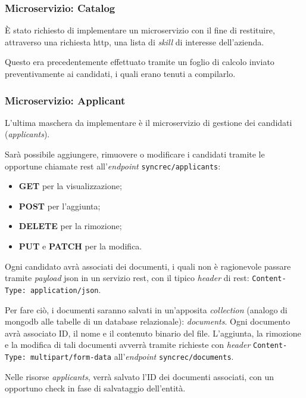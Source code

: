 \subsubsection{Microservizio: Catalog}

È stato richiesto di implementare un \gls{microservizio} con il fine di restituire,
attraverso una richiesta \acrshort{http}, una lista di \textit{skill} di interesse dell'azienda.

Questo era precedentemente effettuato tramite un foglio di calcolo inviato preventivamente ai candidati, i quali erano tenuti a compilarlo.

\subsubsection{Microservizio: Applicant}

L'ultima maschera da implementare è il \gls{microservizio} di gestione dei candidati (\textit{applicants}).

Sarà possibile aggiungere, rimuovere o modificare i candidati tramite
le opportune chiamate \acrshort{rest} all'\textit{endpoint} \texttt{syncrec/applicants}:
\begin{itemize}
	\item \textbf{GET} per la visualizzazione;
	\item \textbf{POST} per l'aggiunta;
	\item \textbf{DELETE} per la rimozione;
	\item \textbf{PUT} e \textbf{PATCH} per la modifica.
\end{itemize}

Ogni candidato avrà associati dei documenti, i quali non è ragionevole passare tramite \textit{payload} \acrshort{json} in un servizio \acrshort{rest}, con il tipico \textit{header} di \acrshort{rest}: \texttt{Content-Type: application/json}.

Per fare ciò, i documenti saranno salvati in un'apposita \textit{collection} (analogo di \gls{mongodb} alle tabelle di un database relazionale):
\textit{documents}.
Ogni documento avrà associato ID, il nome e il contenuto binario del file.
L'aggiunta, la rimozione e la modifica di tali documenti avverrà tramite richieste con \textit{header} \texttt{Content-Type: multipart/form-data}
all'\textit{endpoint} \texttt{syncrec/documents}.

Nelle risorse \textit{applicants}, verrà salvato l'ID dei documenti associati, con un opportuno check in fase di salvataggio dell'entità.

